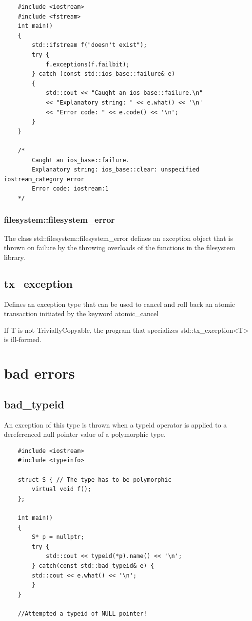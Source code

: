 \documentclass[UTF8,a4paper,12pt]{ctexbook}
\begin{document}
\begin{lstlisting}
	#include <iostream>
	#include <fstream>
	int main()
	{
		std::ifstream f("doesn't exist");
		try {
			f.exceptions(f.failbit);
		} catch (const std::ios_base::failure& e)
		{
			std::cout << "Caught an ios_base::failure.\n"
			<< "Explanatory string: " << e.what() << '\n'
			<< "Error code: " << e.code() << '\n';
		}
	}
					
	/*
		Caught an ios_base::failure.
		Explanatory string: ios_base::clear: unspecified iostream_category error
		Error code: iostream:1
	*/
				\end{lstlisting}
			\subsubsection{filesystem::filesystem\_error}
				The class std::filesystem::filesystem\_error defines an exception object that is thrown on failure by the throwing overloads of the functions in the filesystem library. 
				
		\subsection{tx\_exception}
				Defines an exception type that can be used to cancel and roll back an atomic transaction initiated by the keyword atomic\_cancel
					
				If T is not TriviallyCopyable, the program that specializes std::tx\_exception<T> is ill-formed. 
	\section{bad errors}
		\subsection{bad\_typeid}
			An exception of this type is thrown when a typeid operator is applied to a dereferenced null pointer value of a polymorphic type.
			
\begin{lstlisting}
	#include <iostream>
	#include <typeinfo>
	
	struct S { // The type has to be polymorphic
		virtual void f();
	}; 
	
	int main()
	{
		S* p = nullptr;
		try {
			std::cout << typeid(*p).name() << '\n';
		} catch(const std::bad_typeid& e) {
		std::cout << e.what() << '\n';
		}
	}
	
	//Attempted a typeid of NULL pointer!
\end{lstlisting}
\end{document}
